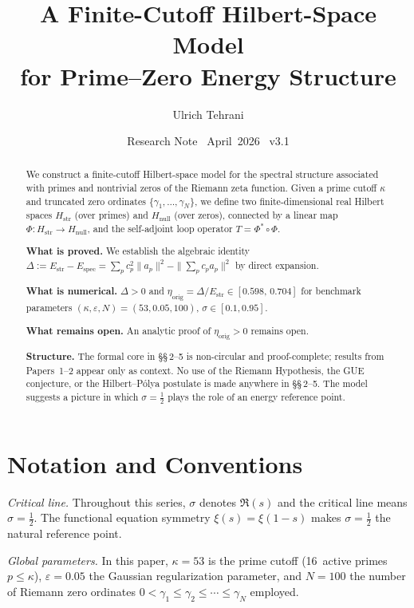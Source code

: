 \documentclass[11pt]{article}
\title{\vspace{-1.5em}\bfseries A Finite-Cutoff Hilbert-Space Model\\[0.4em]
\large for Prime--Zero Energy Structure}
\author{Ulrich Tehrani}
\date{Research Note \textperiodcentered\ April~2026 \textperiodcentered\ v3.1}
\newcommand{\Hstr}{H_{\mathrm{str}}}
\newcommand{\Hnull}{H_{\mathrm{null}}}
\newcommand{\Estr}{E_{\mathrm{str}}}
\newcommand{\Espec}{E_{\mathrm{spec}}}
\newcommand{\etaorig}{\eta_{\mathrm{orig}}}
\begin{document}
\maketitle

\begin{abstract}
We construct a finite-cutoff Hilbert-space model for the spectral structure
associated with primes and nontrivial zeros of the Riemann zeta function.
Given a prime cutoff $\kappa$ and truncated zero ordinates
$\{\gamma_1,\ldots,\gamma_N\}$, we define two finite-dimensional real
Hilbert spaces $\Hstr$ (over primes) and $\Hnull$ (over zeros),
connected by a linear map $\Phi\colon\Hstr\to\Hnull$, and the
self-adjoint loop operator $T = \Phi^*\circ\Phi$.

\textbf{What is proved.}
We establish the algebraic identity
$\Delta := \Estr - \Espec
 = \sum_p c_p^2\|a_p\|^2 - \|\sum_p c_p a_p\|^2$
by direct expansion.

\textbf{What is numerical.}
$\Delta > 0$ and
$\etaorig = \Delta/\Estr \in [0.598,\,0.704]$ for benchmark parameters
$(\kappa,\varepsilon,N)=(53,0.05,100)$, $\sigma\in[0.1,0.95]$.

\textbf{What remains open.}
An analytic proof of $\etaorig>0$ remains open.

\textbf{Structure.}
The formal core in \S\S\,2--5 is non-circular and proof-complete;
results from Papers~1--2 appear only as context.
No use of the Riemann Hypothesis, the GUE conjecture,
or the Hilbert--P\'olya postulate is made anywhere in \S\S\,2--5.
The model suggests a picture in which $\sigma=\tfrac12$ plays
the role of an energy reference point.
\end{abstract}

\vspace{2em}

\section*{Notation and Conventions}
\label{sec:notation}

\emph{Critical line.}
Throughout this series, $\sigma$ denotes $\Re(s)$ and the critical
line means $\sigma=\tfrac12$. The functional equation symmetry
$\xi(s)=\xi(1-s)$ makes $\sigma=\tfrac12$ the natural reference
point.

\medskip
\emph{Global parameters.}
In this paper, $\kappa=53$ is the prime cutoff (16~active primes
$p\leq\kappa$), $\varepsilon=0.05$ the Gaussian regularization
parameter, and $N=100$ the number of Riemann zero ordinates
$0<\gamma_1\leq\gamma_2\leq\cdots\leq\gamma_N$ employed.
\end{document}
